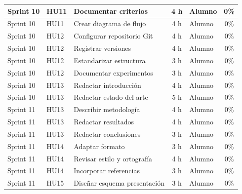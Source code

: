 \documentclass[
11pt, %
]{charter}
\begin{document}
\begin{table}[htpb]
\begin{tabularx}{\linewidth}{@{}|l|l|X|c|l|c|@{}}
Sprint 10 & HU11 & Documentar criterios & 4 h & Alumno & 0\% \\ \hline
Sprint 10 & HU11 & Crear diagrama de flujo & 4 h & Alumno & 0\% \\ \hline
Sprint 10 & HU12 & Configurar repositorio Git & 4 h & Alumno & 0\% \\ \hline
Sprint 10 & HU12 & Registrar versiones & 4 h & Alumno & 0\% \\ \hline
Sprint 10 & HU12 & Estandarizar estructura & 3 h & Alumno & 0\% \\ \hline
Sprint 10 & HU12 & Documentar experimentos & 3 h & Alumno & 0\% \\ \hline
Sprint 10 & HU13 & Redactar introducción & 4 h & Alumno & 0\% \\ \hline
Sprint 10 & HU13 & Redactar estado del arte & 5 h & Alumno & 0\% \\ \hline

Sprint 11 & HU13 & Describir metodología & 4 h & Alumno & 0\% \\ \hline
Sprint 11 & HU13 & Redactar resultados & 4 h & Alumno & 0\% \\ \hline
Sprint 11 & HU13 & Redactar conclusiones & 3 h & Alumno & 0\% \\ \hline
Sprint 11 & HU14 & Adaptar formato & 3 h & Alumno & 0\% \\ \hline
Sprint 11 & HU14 & Revisar estilo y ortografía & 4 h & Alumno & 0\% \\ \hline
Sprint 11 & HU14 & Incorporar referencias & 3 h & Alumno & 0\% \\ \hline
Sprint 11 & HU15 & Diseñar esquema presentación & 3 h & Alumno & 0\% \\ \hline

\end{tabularx}
\end{table}
\end{document}
